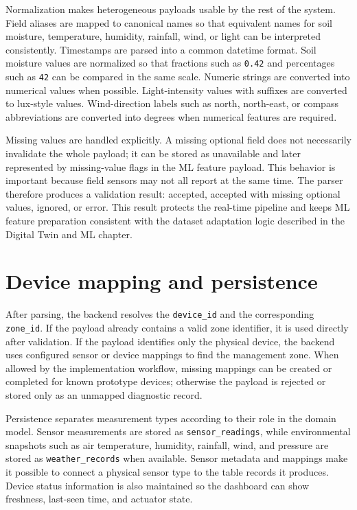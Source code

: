Normalization makes heterogeneous payloads usable by the rest of the system. Field aliases are mapped to canonical names so that equivalent names for soil moisture, temperature, humidity, rainfall, wind, or light can be interpreted consistently. Timestamps are parsed into a common datetime format. Soil moisture values are normalized so that fractions such as \texttt{0.42} and percentages such as \texttt{42} can be compared in the same scale. Numeric strings are converted into numerical values when possible. Light-intensity values with suffixes are converted to lux-style values. Wind-direction labels such as north, north-east, or compass abbreviations are converted into degrees when numerical features are required.

Missing values are handled explicitly. A missing optional field does not necessarily invalidate the whole payload; it can be stored as unavailable and later represented by missing-value flags in the ML feature payload. This behavior is important because field sensors may not all report at the same time. The parser therefore produces a validation result: accepted, accepted with missing optional values, ignored, or error. This result protects the real-time pipeline and keeps ML feature preparation consistent with the dataset adaptation logic described in the Digital Twin and ML chapter.

\section{Device mapping and persistence}

After parsing, the backend resolves the \texttt{device\_id} and the corresponding \texttt{zone\_id}. If the payload already contains a valid zone identifier, it is used directly after validation. If the payload identifies only the physical device, the backend uses configured sensor or device mappings to find the management zone. When allowed by the implementation workflow, missing mappings can be created or completed for known prototype devices; otherwise the payload is rejected or stored only as an unmapped diagnostic record.

Persistence separates measurement types according to their role in the domain model. Sensor measurements are stored as \texttt{sensor\_readings}, while environmental snapshots such as air temperature, humidity, rainfall, wind, and pressure are stored as \texttt{weather\_records} when available. Sensor metadata and mappings make it possible to connect a physical sensor type to the table records it produces. Device status information is also maintained so the dashboard can show freshness, last-seen time, and actuator state.

